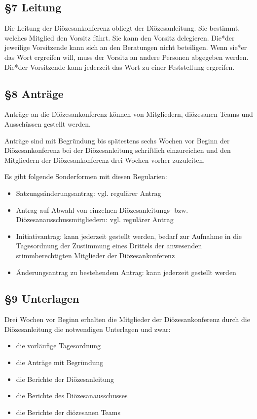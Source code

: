 \documentclass[12pt]{report}
\begin{document}
\begin{flushleft}
\subsection*{§7 Leitung}
Die Leitung der Diözesankonferenz obliegt der Diözesanleitung. Sie bestimmt, welches Mitglied den Vorsitz
führt. Sie kann den Vorsitz delegieren. {\color{red}Die*der} jeweilige Vorsitzende kann sich an den Beratungen nicht beteiligen.
Wenn {\color{red}sie*er} das Wort ergreifen will, muss der Vorsitz an andere Personen abgegeben werden.
{\color{red} Die*der} Vorsitzende kann jederzeit das Wort zu einer Feststellung ergreifen.
\subsection*{§8 Anträge}
Anträge an die Diözesankonferenz können von Mitgliedern, diözesanen Teams und Ausschüssen gestellt werden.

Anträge sind mit Begründung bis spätestens sechs Wochen vor Beginn der Diözesankonferenz bei der Diözesanleitung
schriftlich einzureichen und den Mitgliedern der Diözesankonferenz drei Wochen vorher zuzuleiten.

Es gibt folgende Sonderformen mit diesen Regularien:
\begin{itemize}
  \item Satzungsänderungsantrag: vgl. regulärer Antrag
  \item Antrag auf Abwahl von einzelnen Diözesanleitungs- bzw. Diözesanausschussmitgliedern:
        vgl. regulärer Antrag
  \item Initiativantrag: kann jederzeit gestellt werden, bedarf zur Aufnahme in die Tagesordnung der Zustimmung
        eines Drittels der anwesenden stimmberechtigten Mitglieder der Diözesankonferenz
  \item Änderungsantrag zu bestehendem Antrag: kann jederzeit gestellt werden
\end{itemize}

\subsection*{§9 Unterlagen}
Drei Wochen vor Beginn erhalten die Mitglieder der Diözesankonferenz durch die Diözesanleitung die notwendigen
Unterlagen und zwar:
\begin{itemize}
  \item die vorläufige Tagesordnung
  \item die Anträge mit Begründung
  \item die Berichte der Diözesanleitung	
  \item die Berichte des Diözesanausschusses	
  \item die Berichte der diözesanen Teams
\end{itemize}


\end{flushleft}
\end{document}
